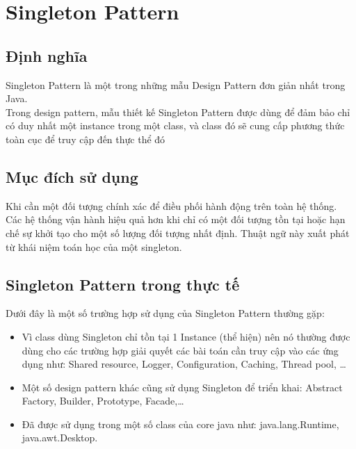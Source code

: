 \chapter{Singleton Pattern}

\section{Định nghĩa}
Singleton Pattern là một trong những mẫu Design Pattern đơn giản nhất trong Java.\\
Trong design pattern, mẫu thiết kế Singleton Pattern được dùng để đảm bảo chỉ có duy nhất một instance trong một class, và class đó sẽ cung cấp phương thức toàn cục để truy cập đến thực thể đó

\section{Mục đích sử dụng}
Khi cần một đối tượng chính xác để điều phối hành động trên toàn hệ thống. Các hệ thống vận hành hiệu quả hơn khi chỉ có một đối tượng tồn tại hoặc hạn chế sự khởi tạo cho một số lượng đối tượng nhất định. Thuật ngữ này xuất phát từ khái niệm toán học của một singleton.

\section{Singleton Pattern trong thực tế}
Dưới đây là một số trường hợp sử dụng của Singleton Pattern thường gặp:
\begin{itemize}
\item	Vì class dùng Singleton chỉ tồn tại 1 Instance (thể hiện) nên nó thường được dùng cho các trường hợp giải quyết các bài toán cần truy cập vào các ứng dụng như: Shared resource, Logger, Configuration, Caching, Thread pool, …\\
\item	Một số design pattern khác cũng sử dụng Singleton để triển khai: Abstract Factory, Builder, Prototype, Facade,…\\
\item	Đã được sử dụng trong một số class của core java như: java.lang.Runtime, java.awt.Desktop.
\end{itemize}
